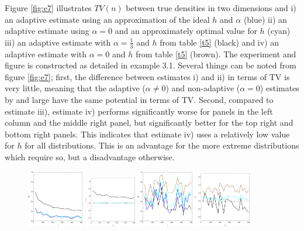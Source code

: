 \documentclass[
twoside,
openright,
titlepage,
numbers=noenddot,
headinclude,%
footinclude=true,
dottedtoc, %
ngerman,
american, %
pagesize=pdftex,
]{book}
\begin{document}
	\begin{example}
		Figure \ref{fig:e7} illustrates $TV(n)$ between true densities in two dimensions and i) an adaptive estimate using an approximation of the ideal $h$ and $\alpha$ (blue) ii) an adaptive estimate using $\alpha=0$ and an approximately optimal value for $h$ (cyan) iii) an adaptive estimate with $\alpha=\frac{1}{3}$ and $h$ from table \ref{t5} (black) and iv) an adaptive estimate with $\alpha=0$ and $h$ from table \ref{t5} (brown). The experiment and figure is constructed as detailed in example 3.1.\newline
		Several things can be noted from figure \ref{fig:e7}; first, the difference between estimates i) and ii) in terms of TV is very little, meaning that the adaptive ($\alpha\neq 0$) and non-adaptive ($\alpha=0$) estimates by and large have the same potential in terms of TV. Second, compared to estimate iii), estimate iv) performs significantly worse for panels in the left column and the middle right panel, but significantly better for the top right and bottom right panels. This indicates that estimate iv) uses a relatively low value for $h$ for all distributions. This is an advantage for the more extreme distributions which require so, but a disadvantage otherwise.  
		\begin{figure}[H]
			\centering
			\captionsetup{width=0.95\textwidth}
			\includegraphics[width=0.22\textwidth]{figures/2DTVexamples/e2n1}
			\includegraphics[width=0.2\textwidth]{figures/2DTVexamples/e2n2}
			\includegraphics[width=0.22\textwidth]{figures/2DTVexamples/e2t1}
			\includegraphics[width=0.22\textwidth]{figures/2DTVexamples/e2t2}

\end{figure}
\end{example}
\end{document}
